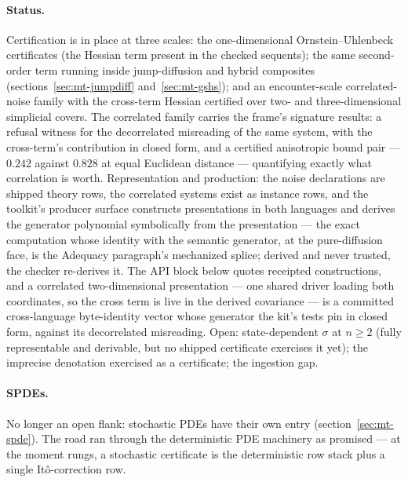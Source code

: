 \paragraph{Status.} Certification is in place at three scales: the
one-dimensional Ornstein--Uhlenbeck certificates (the Hessian term
present in the checked sequents); the same second-order term running
inside jump-diffusion and hybrid composites
(sections~\ref{sec:mt-jumpdiff} and~\ref{sec:mt-gshs}); and an
encounter-scale correlated-noise family with the cross-term Hessian
certified over two- and three-dimensional simplicial covers. The
correlated family carries the frame's signature results: a refusal
witness for the decorrelated misreading of the same system, with the
cross-term's contribution in closed form, and a certified anisotropic
bound pair --- $0.242$ against $0.828$ at equal Euclidean
distance --- quantifying exactly what correlation is worth.
Representation and production: the noise declarations are shipped
theory rows, the correlated systems exist as instance rows, and the
toolkit's producer surface constructs presentations in both languages
and derives the generator polynomial symbolically from the
presentation --- the exact computation whose identity with the
semantic generator, at the pure-diffusion face, is the Adequacy
paragraph's mechanized splice; derived and never trusted, the checker
re-derives it. The API block below quotes receipted constructions,
and a correlated two-dimensional presentation --- one shared driver
loading both coordinates, so the cross term is live in the derived
covariance --- is a committed cross-language byte-identity vector
whose generator the kit's tests pin in closed form, against its
decorrelated misreading. Open: state-dependent $\sigma$ at $n \ge 2$
(fully representable and derivable, but no shipped certificate
exercises it yet); the imprecise denotation exercised as a
certificate; the ingestion gap.

\paragraph{SPDEs.} No longer an open flank: stochastic PDEs have
their own entry (section~\ref{sec:mt-spde}). The road ran through the
deterministic PDE machinery as promised --- at the moment rungs, a
stochastic certificate is the deterministic row stack plus a single
It\^o-correction row.

